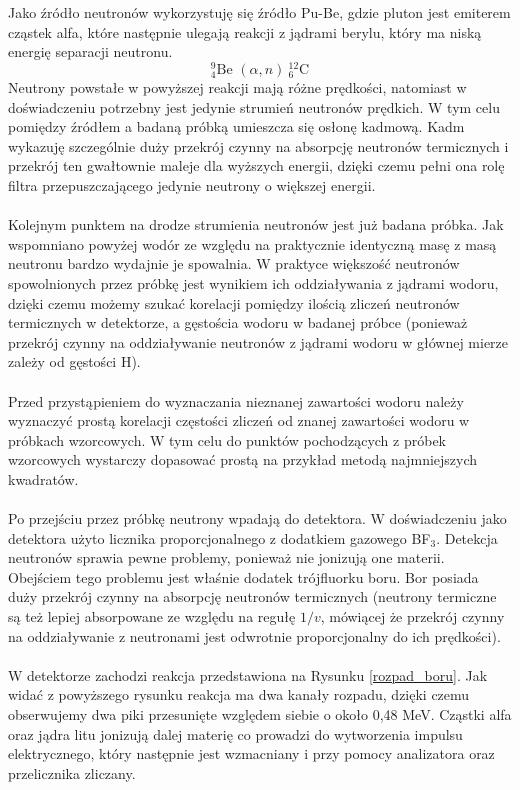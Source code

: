 \documentclass{article}
\begin{document}
Jako źródło neutronów wykorzystuję się źródło Pu-Be, gdzie pluton jest emiterem cząstek alfa, 
które następnie ulegają reakcji z jądrami berylu, który ma niską energię separacji neutronu.\\
\[^9_4\text{Be }(\alpha,n)\ ^{12}_6\text{C}\]
Neutrony powstałe w powyższej reakcji mają różne prędkości, natomiast w doświadczeniu potrzebny jest jedynie strumień neutronów prędkich. W tym celu pomiędzy źródłem a badaną próbką umieszcza się osłonę kadmową. Kadm wykazuję szczególnie duży przekrój czynny na absorpcję neutronów termicznych i przekrój ten gwałtownie maleje dla wyższych energii, dzięki czemu pełni ona rolę filtra przepuszczającego jedynie neutrony o większej energii.\\\\
Kolejnym punktem na drodze strumienia neutronów jest już badana próbka. Jak wspomniano powyżej wodór ze względu na praktycznie identyczną masę z masą neutronu bardzo wydajnie je spowalnia. W praktyce większość neutronów spowolnionych przez próbkę jest wynikiem ich oddziaływania z jądrami wodoru, dzięki czemu możemy szukać korelacji pomiędzy ilością zliczeń neutronów termicznych w detektorze, a gęstościa wodoru w badanej próbce (ponieważ przekrój czynny na oddziaływanie neutronów z jądrami wodoru w głównej mierze zależy od  gęstości H). \\\\
Przed przystąpieniem do wyznaczania nieznanej zawartości wodoru należy wyznaczyć prostą korelacji częstości zliczeń od znanej zawartości wodoru w próbkach wzorcowych. W tym celu do punktów pochodzących z próbek wzorcowych wystarczy dopasować prostą na przykład metodą najmniejszych kwadratów.\\\\
Po przejściu przez próbkę neutrony wpadają do detektora. W doświadczeniu jako detektora użyto licznika proporcjonalnego z dodatkiem gazowego BF$_3$. Detekcja neutronów sprawia pewne problemy, ponieważ nie jonizują one materii. Obejściem tego problemu jest właśnie dodatek trójfluorku boru. Bor posiada duży przekrój czynny na absorpcję neutronów termicznych (neutrony termiczne są też lepiej absorpowane ze względu na regułę $1/v$, mówiącej że przekrój czynny na oddziaływanie z neutronami jest odwrotnie proporcjonalny do ich prędkości). \\\\
W detektorze zachodzi reakcja przedstawiona na Rysunku \ref{rozpad_boru}. Jak widać z powyższego rysunku reakcja ma dwa kanały rozpadu, dzięki czemu obserwujemy dwa piki przesunięte względem siebie o około 0,48 MeV. Cząstki alfa oraz jądra litu jonizują dalej materię co prowadzi do wytworzenia impulsu elektrycznego, który następnie jest wzmacniany i przy pomocy analizatora oraz przelicznika zliczany.
\end{document}
